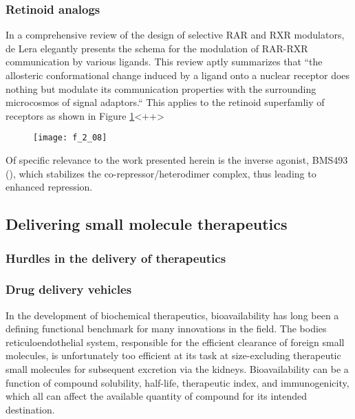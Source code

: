 \begin{refsection}
\subsubsection{Retinoid analogs}

In a comprehensive review of the design of selective RAR and RXR modulators, de
Lera  elegantly presents the schema for the modulation of RAR-RXR
communication by various ligands. This review aptly summarizes that ``the
allosteric conformational change induced by a ligand onto a nuclear receptor
does nothing but modulate its communication properties with the surrounding
microcosmos of signal adaptors.``\cite{DeLera2007} This applies to the retinoid
superfamliy of receptors as shown in Figure \ref{fig:RAR_communication}<++>
\begin{figure}[h!] \centering \texttt{[image: f\_2\_08]}
    \caption[]{\cite{DeLera2007}}\label{fig:RAR_communication} \end{figure}
Of specific relevance to the work presented herein is the inverse agonist,
BMS493 (), which
stabilizes the co-repressor/heterodimer complex, thus leading to enhanced
repression.\cite{Germain2002} 

\subsection{Delivering small molecule therapeutics}

\subsubsection{Hurdles in the delivery of therapeutics}

\subsubsection{Drug delivery vehicles}

In the development of biochemical therapeutics, bioavailability has long been a
defining functional benchmark for many innovations in the field. The bodies
reticuloendothelial system, responsible for the efficient clearance of foreign
small molecules, is unfortunately too efficient at its task at size-excluding
therapeutic small molecules for subsequent excretion via the kidneys.
Bioavailability can be a function of compound solubility, 
half-life, therapeutic index, and immunogenicity, which all can affect the
available quantity of compound for its intended
destination.\cite{Petros2010,Davis2008,Shah1992}


\end{refsection}
